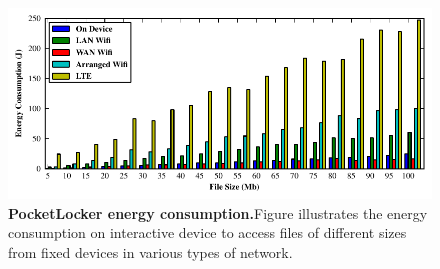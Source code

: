 \begin{figure}[t]

  \includegraphics[width=\textwidth]{./figures/energyconsumption.pdf}

  \caption{\small \textbf{PocketLocker energy consumption.}Figure illustrates the energy
  consumption on interactive device to access files of different sizes from
fixed devices in various types of network.}

  \label{fig-evaluation-energy}

\end{figure}

